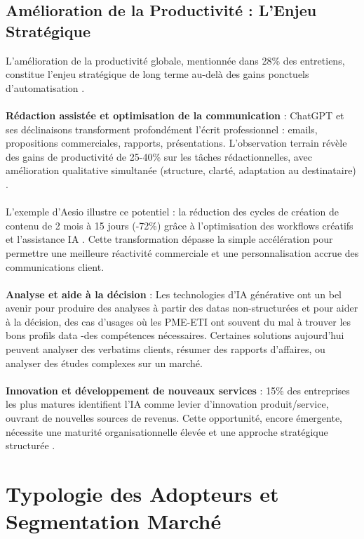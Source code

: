 \subsection{Amélioration de la Productivité : L'Enjeu Stratégique}

L'amélioration de la productivité globale, mentionnée dans 28\% des entretiens, constitue l'enjeu stratégique de long terme au-delà des gains ponctuels d'automatisation \cite{brynjolfsson2017business}.
\\\\
\textbf{Rédaction assistée et optimisation de la communication} : ChatGPT et ses déclinaisons transforment profondément l'écrit professionnel : emails, propositions commerciales, rapports, présentations. L'observation terrain révèle des gains de productivité de 25-40\% sur les tâches rédactionnelles, avec amélioration qualitative simultanée (structure, clarté, adaptation au destinataire) \cite{luwai2025meetings}.
\\\\
L'exemple d'Aesio illustre ce potentiel : la réduction des cycles de création de contenu de 2 mois à 15 jours (-72\%) grâce à l'optimisation des workflows créatifs et l'assistance IA \cite{luwai2025aesio}. Cette transformation dépasse la simple accélération pour permettre une meilleure réactivité commerciale et une personnalisation accrue des communications client.
\\\\
\textbf{Analyse et aide à la décision} : Les technologies d’IA générative ont un bel avenir pour produire des analyses à partir des datas non-structurées et pour aider à la décision, des cas d’usages où les PME-ETI ont souvent du mal à trouver les bons profils data -des compétences nécessaires. Certaines solutions aujourd’hui peuvent analyser des verbatims clients, résumer des rapports d’affaires, ou analyser des études complexes sur un marché.
\\\\
\textbf{Innovation et développement de nouveaux services} : 15\% des entreprises les plus matures identifient l'IA comme levier d'innovation produit/service, ouvrant de nouvelles sources de revenus. Cette opportunité, encore émergente, nécessite une maturité organisationnelle élevée et une approche stratégique structurée \cite{christensen1997innovator}.

\section{Typologie des Adopteurs et Segmentation Marché}

